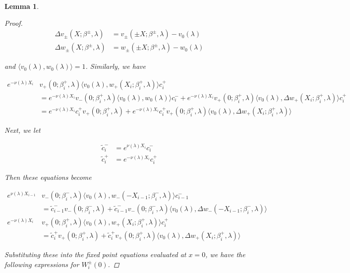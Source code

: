 \documentclass[12pt]{article}
\newtheorem{lemma}{Lemma}
\begin{document}
\begin{lemma}
\begin{proof}
\begin{align*}
\Delta v_\pm(X; \beta^\pm, \lambda) &= v_\pm(\pm X; \beta^\pm, \lambda) - v_0(\lambda) \\
\Delta w_\pm(X; \beta^\pm, \lambda) &= w_\pm(\pm X; \beta^\pm, \lambda) - w_0(\lambda) 
\end{align*}

and $\langle v_0(\lambda), w_0(\lambda) \rangle = 1$. Similarly, we have

\begin{align*}
e^{-\nu(\lambda)X_i} &v_+(0; \beta_i^+, \lambda) \langle v_0(\lambda), w_+(X_i; \beta_i^+, \lambda) \rangle c_i^+ \\
&= e^{-\nu(\lambda)X_i} v_-(0; \beta_i^+, \lambda) \langle v_0(\lambda), w_0(\lambda) \rangle c_i^- + e^{-\nu(\lambda)X_i} v_+(0; \beta_i^+, \lambda) \langle v_0(\lambda), \Delta w_+(X_i; \beta_i^+, \lambda) \rangle c_i^+ \\
&= e^{-\nu(\lambda)X_i} c_i^+ v_+(0; \beta_i^+, \lambda) + e^{-\nu(\lambda)X_i} c_i^+ v_+(0; \beta_i^+, \lambda) \langle v_0(\lambda), \Delta w_+(X_i; \beta_i^+, \lambda) \rangle 
\end{align*}

Next, we let

\begin{align*}
\tilde{c}_i^- &= e^{\nu(\lambda)X_i} c_i^- \\
\tilde{c}_i^+ &= e^{-\nu(\lambda)X_i} c_i^+
\end{align*}

Then these equations become

\begin{align*}
e^{\nu(\lambda)X_{i-1}} &v_-(0; \beta_i^-, \lambda) \langle v_0(\lambda), w_-(-X_{i-1}; \beta_i^-, \lambda) \rangle c_{i-1}^- \\
&= \tilde{c}_{i-1}^- v_-(0; \beta_i^-, \lambda) + \tilde{c}_{i-1}^- v_-(0; \beta_i^-, \lambda) \langle v_0(\lambda), \Delta w_-(-X_{i-1}; \beta_i^-, \lambda) \rangle \\
e^{-\nu(\lambda)X_i} &v_+(0; \beta_i^+, \lambda) \langle v_0(\lambda), w_+(X_i; \beta_i^+, \lambda) \rangle c_i^+ \\
&= \tilde{c}_i^+ v_+(0; \beta_i^+, \lambda) + \tilde{c}_i^+ v_+(0; \beta_i^+, \lambda) \langle v_0(\lambda), \Delta w_+(X_i; \beta_i^+, \lambda) \rangle 
\end{align*}

Substituting these into the fixed point equations evaluated at $x = 0$, we have the following expressions for $W_i^\pm(0)$.


\end{proof}
\end{lemma}
\end{document}
